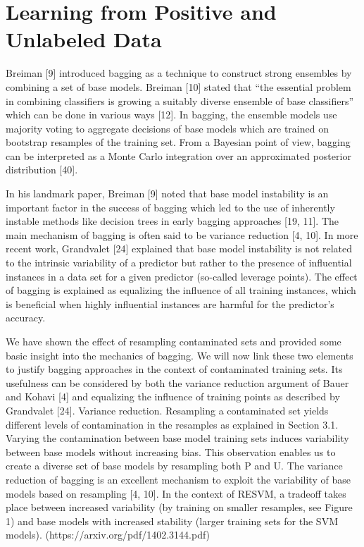 \section{Learning from Positive and Unlabeled Data}

Breiman [9] introduced bagging as a technique to construct strong ensembles by combining a set of base models. Breiman [10] stated that “the essential problem in combining classiﬁers is growing a suitably diverse ensemble of base classiﬁers” which can be done in various ways [12]. In bagging, the ensemble models use majority voting to aggregate decisions of base models which are trained on bootstrap resamples of the training set. From a Bayesian point of view, bagging can be interpreted as a Monte Carlo integration over an approximated posterior distribution [40]. 

In his landmark paper, Breiman [9] noted that base model instability is an important factor in the success of bagging which led to the use of inherently instable methods like decision trees in early bagging approaches [19, 11]. The main mechanism of bagging is often said to be variance reduction [4, 10]. In more recent work, Grandvalet [24] explained that base model instability is not related to the intrinsic variability of a predictor but rather to the presence of inﬂuential instances in a data set for a given predictor (so-called leverage points).
The eﬀect of bagging is explained as equalizing the inﬂuence of all training instances, which is beneﬁcial when highly inﬂuential instances are harmful for the predictor’s accuracy.

We have shown the eﬀect of resampling contaminated sets and provided some basic insight into the mechanics of bagging. We will now link these two elements to justify bagging approaches in the context of contaminated training sets. Its usefulness can be considered by both the variance reduction argument of Bauer and Kohavi [4] and equalizing the inﬂuence of training points as described by Grandvalet [24]. Variance reduction. Resampling a contaminated set yields diﬀerent levels of contamination in the resamples as explained in Section 3.1. Varying the contamination between base model training sets induces variability between base models without increasing bias. This observation enables us to create a diverse set of base models by resampling both P and U. The variance reduction of bagging is an excellent mechanism to exploit the variability of base models based on resampling [4, 10]. In the context of RESVM, a tradeoﬀ takes place between increased variability (by training on smaller resamples, see Figure 1) and base models with increased stability (larger training sets for the SVM models). (https://arxiv.org/pdf/1402.3144.pdf)

